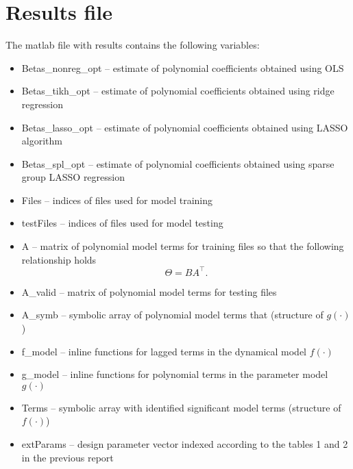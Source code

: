 \documentclass[a4paper,11pt,twoside]{article}
\theoremstyle{mytheoremstyle}
\begin{document}
\section{Results file}
The matlab file with results contains the following variables:
\begin{itemize}
	\item Betas\_nonreg\_opt -- estimate of polynomial coefficients obtained using OLS
	\item Betas\_tikh\_opt -- estimate of polynomial coefficients obtained using ridge regression
	\item Betas\_lasso\_opt -- estimate of polynomial coefficients obtained using LASSO algorithm
	\item Betas\_spl\_opt -- estimate of polynomial coefficients obtained using sparse group LASSO regression
	\item Files -- indices of files used for model training
	\item testFiles -- indices of files used for model testing
	\item A -- matrix of polynomial model terms for training files so that the following relationship holds
	\begin{equation*}
	\Theta = B A^{\top}.
	\end{equation*}
	\item A\_valid -- matrix of polynomial model terms for testing files
	\item A\_symb -- symbolic array of polynomial model terms that (structure of $g(\cdot)$)
	\item f\_model -- inline functions for lagged terms in the dynamical model $f(\cdot)$
	\item g\_model -- inline functions for polynomial terms in the parameter model  $g(\cdot)$
	\item Terms -- symbolic array with identified significant model terms (structure of $f(\cdot)$)
	\item extParams -- design parameter vector indexed according to the tables 1 and 2 in the previous report
\end{itemize}
\end{document}
